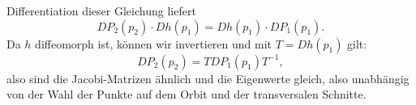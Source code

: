 \documentclass[a4paper]{article}
\begin{document}
Differentiation dieser Gleichung liefert
$$DP_2(p_2) \cdot Dh(p_1) = Dh(p_1) \cdot DP_1(p_1).$$
Da $h$ diffeomorph ist, können wir invertieren und mit $T = Dh(p_1)$ gilt:
$$DP_2(p_2) = T DP_1 (p_1) T^{-1},$$
also sind die Jacobi-Matrizen ähnlich und die Eigenwerte gleich, also unabhängig von der Wahl der Punkte auf dem Orbit und der transversalen Schnitte.
\end{document}
